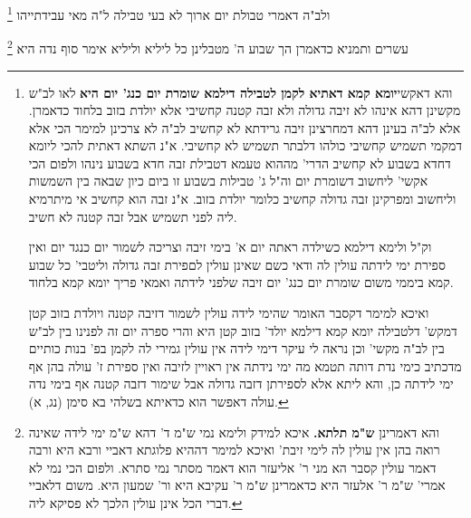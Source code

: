\documentclass[12pt, openany]{book}
\newcommand{\footnotecomment}[1]{\footnote{#1}}
\newcommand{\commenta}[1]{\footnotecomment{#1}}
\begin{document}
{ולב"ה דאמרי טבולת יום ארוך לא בעי טבילה ל"ה מאי עבידתייהו 
\commenta{ והא דאקשי\textbf{יומא קמא דאתיא לקמן לטבילה דילמא שומרת יום כנג' יום היא}  לאו לב"ש מקשינן דהא אינהו לא זיבה גדולה ולא זבה קטנה קחשיבי אלא יולדת בזוב בלחוד כדאמרן. אלא לב"ה בעינן דהא דמחרצינן זיבה גרידתא לא קחשיב לב"ה לא צרכינן למימר הכי אלא דמקמי תשמיש קחשיבי כולהו דלבתר תשמיש לא קחשיבי. א"נ השתא דאתית להכי ליומא דחדא בשבוע לא קחשיב הדרי' מההוא טעמא דטבילת זבה חדא בשבוע נינהו ולפום הכי אקשי' ליחשוב דשומרת יום וה"ל ג' טבילות בשבוע זו ביום כיון שבאה בין השמשות וליחשוב ומפרקינן זבה גדולה קחשיב כלומר יולדת בזוב. א"נ זבה הוא קחשיב אי מיתרמיא ליה לפני תשמיש אבל זבה קטנה לא חשיב.\par  וק"ל ולימא דילמא כשילדה ראתה יום א' בימי זיבה וצריכה לשמור יום כנגד יום ואין ספירת ימי לידתה עולין לה ודאי כשם שאינן עולין לםפירת זבה גדולה וליטבי' כל שבוע קמא ביממי משום שומרת יום כנג' יום זיבה שלפני לידתה ואמאי פריך יומא קמא בלחוד.\par ואיכא למימר דקסבר האומר שהימי לידה עולין לשמור דזיבה קטנה ויולדת בזוב קטן דמקש' דלטבילה יומא קמא דילמא יולד' בזוב קטן היא והרי ספרה יום זה לפנינו בין לב"ש בין לב"ה מקשי' וכן נראה לי עיקר דימי לידה אין עולין גמירי לה לקמן בפ' בנות כותיים מדכתיב כימי נדת דותה תטמא מה ימי נידתה אין ראויין לזיבה ואין ספירת ז' עולה בהן אף ימי לידתה כן, והא ליתא אלא לספירתן דזבה גדולה אבל שימור דזבה קטנה אף בימי נדה עולה דאפשר הוא כדאיתא בשלהי בא סימן (נג, א). }

עשרים ותמניא כדאמרן הך שבוע ה' מטבלינן כל ליליא וליליא אימר סוף נדה היא 
\commenta{והא דאמרינן \textbf{ש"מ תלתא.}  איכא למידק ולימא נמי ש"מ ד' דהא ש"מ ימי לידה שאינה רואה בהן אין עולין לה לימי זיבת' ואיכא למימר דההיא פלוגתא דאביי ורבא היא ורבה דאמר עולין קסבר הא מני ר' אליעזר הוא דאמר מסתר נמי סתרא. ולפום הכי נמי לא אמרי' ש"מ ר' אלעזר היא כדאמרינן ש"מ ר' עקיבא היא ור' שמעון היא. משום דלאביי דברי הכל אינן עולין הלכך לא פסיקא ליה. }

}
\end{document}

